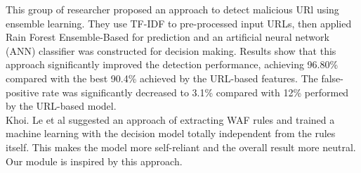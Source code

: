 \newline
This group of researcher \cite{s22093373} proposed an approach to detect malicious URl using ensemble learning. They use TF-IDF to pre-processed input URLs, then applied Rain Forest Ensemble-Based for prediction and an artificial neural network (ANN) classifier was constructed for decision making. Results show that this approach significantly improved the detection performance, achieving 96.80\% compared with the best 90.4\% achieved by the URL-based features. The false-positive rate was significantly decreased to 3.1\% compared with 12\% performed by the URL-based model. \\ \newline
Khoi. Le et al \cite{Khoi} suggested an approach of extracting WAF rules and trained a machine learning with the decision model totally independent from the rules itself. This makes the model more self-reliant and the overall result more neutral. Our module is inspired by this approach.\\ 
